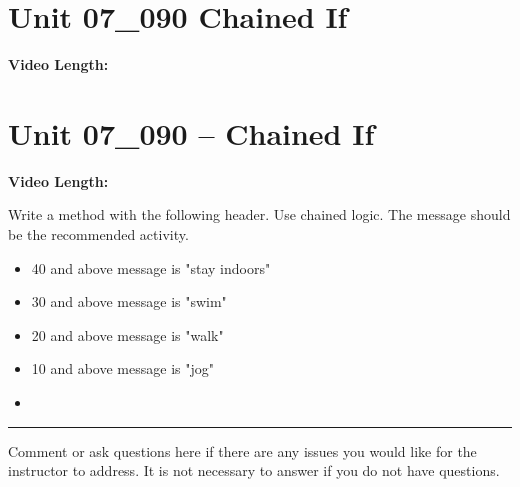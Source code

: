 \documentclass[letterpaper,12pt]{exam}
\newcommand{\unit}{Unit 07}
\begin{document}
\begin{questions}
\section*{\unit\_090 Chained If} %
\noindent \textbf{Video Length: }



\section*{\unit\_090 -- Chained If} %
\noindent \textbf{Video Length: }

\begin{samepage}
    \question Write a method with the following header.  Use chained logic.  The message should be the recommended activity.
      \begin{itemize} 
        \item 40 and above message is "stay indoors"
        \item 30 and above message is "swim"
        \item 20 and above message is "walk"
        \item 10 and above message is "jog"
        \vspace{5mm}
        \item 
        \vspace{5mm}
       \end{itemize}
\end{samepage}

\begin{samepage}
    \begin{center}
    \rule{0.8\textwidth}{.4pt}
    \end{center}
	\question Comment or ask questions here if there are any issues you would like for the instructor to address.  It is not necessary to answer if you do not have questions.
	\vspace{30mm}
\end{samepage}

\end{questions}
\end{document}
